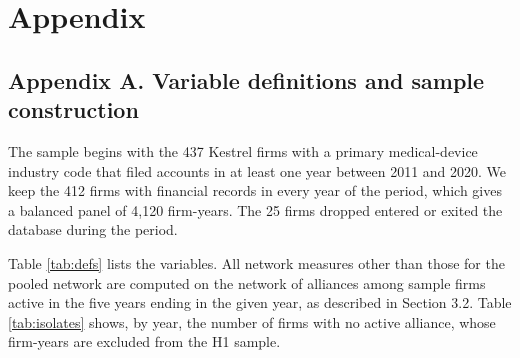 \documentclass[12pt]{article}
\begin{document}
\clearpage
\appendix
\doublespacing
\section*{Appendix}

\subsection*{Appendix A. Variable definitions and sample construction}

The sample begins with the 437 Kestrel firms with a primary medical-device industry code that filed accounts in at least one year between 2011 and 2020. We keep the 412 firms with financial records in every year of the period, which gives a balanced panel of 4,120 firm-years. The 25 firms dropped entered or exited the database during the period.

Table \ref{tab:defs} lists the variables. All network measures other than those for the pooled network are computed on the network of alliances among sample firms active in the five years ending in the given year, as described in Section 3.2. Table \ref{tab:isolates} shows, by year, the number of firms with no active alliance, whose firm-years are excluded from the H1 sample.
\end{document}
